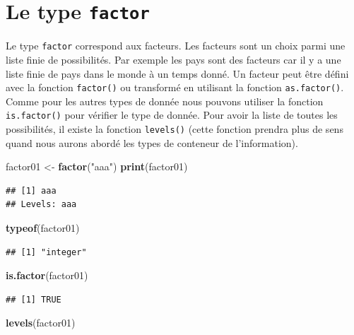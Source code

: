 \documentclass[
]{book}
\newenvironment{Shaded}{\begin{snugshade}}{\end{snugshade}}
\newcommand{\KeywordTok}[1]{\textcolor[rgb]{0.13,0.29,0.53}{\textbf{#1}}}
\newcommand{\NormalTok}[1]{#1}
\newcommand{\StringTok}[1]{\textcolor[rgb]{0.31,0.60,0.02}{#1}}
\begin{document}
\hypertarget{le-type-factor}{%
\section{\texorpdfstring{Le type \texttt{factor}}{Le type factor}}\label{le-type-factor}}

Le type \texttt{factor} correspond aux facteurs. Les facteurs sont un choix parmi une liste finie de possibilités. Par exemple les pays sont des facteurs car il y a une liste finie de pays dans le monde à un temps donné. Un facteur peut être défini avec la fonction \texttt{factor()} ou transformé en utilisant la fonction \texttt{as.factor()}. Comme pour les autres types de donnée nous pouvons utiliser la fonction \texttt{is.factor()} pour vérifier le type de donnée. Pour avoir la liste de toutes les possibilités, il existe la fonction \texttt{levels()} (cette fonction prendra plus de sens quand nous aurons abordé les types de conteneur de l'information).

\begin{Shaded}
\begin{Highlighting}[]
\NormalTok{factor01 <-}\StringTok{ }\KeywordTok{factor}\NormalTok{(}\StringTok{"aaa"}\NormalTok{)}
\KeywordTok{print}\NormalTok{(factor01)}
\end{Highlighting}
\end{Shaded}

\begin{verbatim}
## [1] aaa
## Levels: aaa
\end{verbatim}

\begin{Shaded}
\begin{Highlighting}[]
\KeywordTok{typeof}\NormalTok{(factor01)}
\end{Highlighting}
\end{Shaded}

\begin{verbatim}
## [1] "integer"
\end{verbatim}

\begin{Shaded}
\begin{Highlighting}[]
\KeywordTok{is.factor}\NormalTok{(factor01)}
\end{Highlighting}
\end{Shaded}

\begin{verbatim}
## [1] TRUE
\end{verbatim}

\begin{Shaded}
\begin{Highlighting}[]
\KeywordTok{levels}\NormalTok{(factor01)}
\end{Highlighting}
\end{Shaded}
\end{document}
